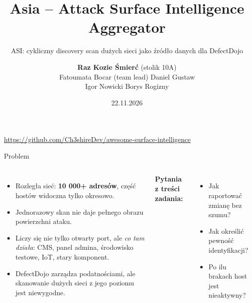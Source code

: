 \documentclass[aspectratio=169,11pt]{beamer}
\title{Asia -- Attack Surface Intelligence Aggregator}
\subtitle{ASI: cykliczny discovery scan dużych sieci jako źródło danych dla DefectDojo}
\author{\textbf{Raz Kozie Śmierć} (stolik 10A)\\[1.5ex] Fatoumata Bocar (team lead) \textbullet{} Daniel Gustaw\\ Igor Nowicki \textbullet{} Borys Rogizny}
\institute{HackNation 2026 \textbullet{} wyzwanie CBI AGH}
\date{22.11.2026}
\begin{document}
\begin{frame}
  \titlepage
  \centering\small
  \url{https://github.com/Ch3shireDev/awesome-surface-intelligence}
\end{frame}

\begin{frame}{Problem}
  \begin{columns}[T]
    \begin{itemize}
      \item Rozległa sieć: \textbf{10 000+ adresów}, część hostów widoczna tylko okresowo.
      \item Jednorazowy skan nie daje pełnego obrazu powierzchni ataku.
      \item Liczy się nie tylko otwarty port, ale \emph{co tam działa}: CMS, panel admina,
            środowisko testowe, IoT, stary komponent.
      \item DefectDojo zarządza podatnościami, ale skanowanie dużych sieci z jego poziomu jest niewygodne.
    \end{itemize}
    \textbf{Pytania z treści zadania:}
    \begin{itemize}\small
      \item Jak raportować zmianę bez szumu?
      \item Jak określić pewność identyfikacji?
      \item Po ilu brakach host jest nieaktywny?
    \end{itemize}
  \end{columns}
\end{frame}
\end{document}
